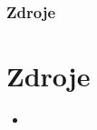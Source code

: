 \documentclass[aspectratio=43]{beamer}
\title{}
\subtitle{}
\author{Havránek Kryštof ČVUT-FEL}
\date{}
\institute{Gymnázium, Praha 6, Arabská 14}
\begin{document}
\begin{frame}[plain]
	\maketitle
\end{frame}

\clearpage
\setcounter{framenumber}{0}


\appendix
\begin{frame}[plain]
	\frametitle{Zdroje}
	\section{Zdroje}
	\changefontsizes{7pt}
	\begin{itemize}
		\item
	\end{itemize}
\end{frame}
\end{document}
